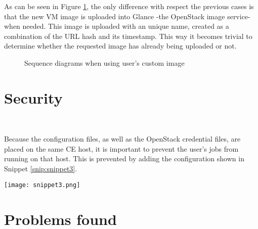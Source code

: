 \documentclass[a4paper]{jpconf}
\begin{document}
As can be seen in Figure \ref{fig:custom}, 
the only difference with respect the previous cases is that the new VM image is uploaded into Glance -the OpenStack image service- when needed.
This image is uploaded with an unique name, 
created as a combination of the URL hash and its timestamp. 
This way it becomes trivial to determine whether the requested image has already being uploaded or not. 

\begin{figure}[h]
    \centering
    \qquad
    \caption{Sequence diagrams when using user's custom image}%
    \label{fig:custom}%
\end{figure}


\section{Security}

~

Because the configuration files, as well as the OpenStack credential files, 
are placed on the same CE host, it is important to prevent the user's jobs from running on that host.
This is prevented by adding the configuration shown in Snippet \ref{snip:snippet3}.


\begin{snippet}[h]
    \centering
    \renewcommand\figurename{Snippet}
    \texttt{[image: snippet3.png]}
    \caption{Setup to prevent user's jobs being forked at the HTCondor-CE host.}
    \label{snip:snippet3}
\end{snippet}



\section{Problems found}
\end{document}
